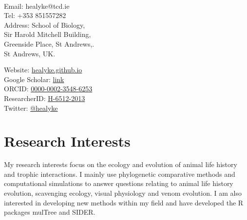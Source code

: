 \documentclass[10pt,a4paper]{article}
\begin{document}
\par{\smallskip\par}

\large{}\\
\smallskip


\begin{minipage}[t]{0.5\textwidth}
\raggedright

Email:  healyke@tcd.ie\\
Tel: \hspace{0mm}+353 851557282\\
Address: School of Biology,\\
\hspace{0mm}Sir Harold Mitchell Building,\\
\hspace{0mm}Greenside Place, St Andrews,.\\ 
\hspace{0mm}St Andrews, UK.\\ 

\end{minipage}
\begin{minipage}[t]{0.45\textwidth}

Website: \href{http://healyke.github.io}{healyke.github.io}\\
Google Scholar: \href{http://scholar.google.com/citations?user=5Kb9u8EAAAAJ}{link}\\
ORCID: \href{http://orcid.org/0000-0002-3548-6253}{0000-0002-3548-6253}\\
ResearcherID: \href{http://www.researcherid.com/rid/H-6512-2013}{H-6512-2013}\\
Twitter: \href{https://twitter.com/healyke}{@healyke}\\
\end{minipage}

\bigskip

\section{Research Interests}
\raggedright	
My research interests focus on the ecology and evolution of animal life history and trophic interactions. I mainly use phylogenetic comparative methods and computational simulations to answer questions relating to animal life history evolution, scavenging ecology, visual physiology and venom evolution. I am also interested in developing new methods within my field and have developed the R packages mulTree and SIDER.
\bigskip
\end{document}
